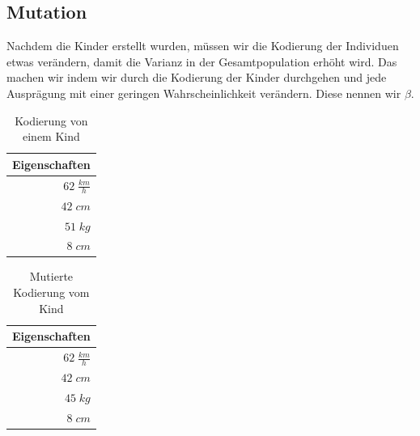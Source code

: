 \newpage
        \subsection{Mutation}
            Nachdem die Kinder erstellt wurden, müssen wir die Kodierung der Individuen etwas verändern, damit die Varianz in der Gesamtpopulation erhöht wird. Das machen wir indem wir durch die Kodierung der Kinder durchgehen und jede Ausprägung mit einer geringen Wahrscheinlichkeit verändern. Diese nennen wir $\beta$.

            \hspace*{-2cm}
            \begin{multicols}{2}
                \begin{table}[H]
                    \begin{center}
                    \begin{tabular}{ |r| } 
                        \hline
                        \hfill Eigenschaften  \\ \hline
                        \cellcolor{yellow!25} $ 62\; \frac{km}{h}$ \\ \hline
                        \cellcolor{blue!25}   $ 42\; cm          $ \\ \hline
                        \cellcolor{blue!25}   $ 51\; kg          $ \\ \hline
                        \cellcolor{yellow!25} $  8\; cm          $ \\ \hline
                    \end{tabular}
                    \end{center}
                    \caption{Kodierung von einem Kind \label{fig:child-enc}}
                \end{table}

                \begin{table}[H]
                    \begin{center}
                    \begin{tabular}{ |r| } 
                        \hline
                        \hfill Eigenschaften  \\ \hline
                        \cellcolor{yellow!25} $ 62\; \frac{km}{h}$ \\ \hline
                        \cellcolor{blue!25}   $ 42\; cm          $ \\ \hline
                        \cellcolor{red!25}    $ 45\; kg          $ \\ \hline
                        \cellcolor{yellow!25} $  8\; cm          $ \\ \hline
                    \end{tabular}
                    \end{center}
                    \caption{Mutierte Kodierung vom Kind\label{fig:mut-child-enc}}
                \end{table}
            \end{multicols}


